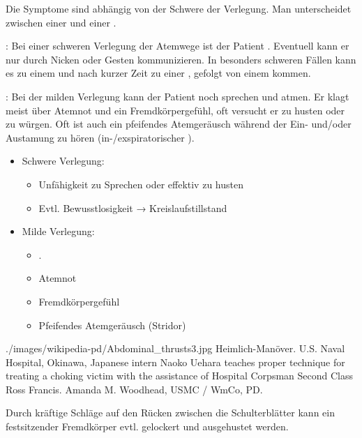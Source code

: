 \clearpage
{}
{%
Die Symptome sind abhängig  von der Schwere der Verlegung.
Man unterscheidet zwischen einer  und einer
\citep{Erc2005Sec2,Erc2005Sec6,Erc2005DeSec2,Erc2005DeSec6}.

:
Bei einer schweren Verlegung der Atemwege ist der Patient 
. Eventuell kann
er nur durch Nic\-k\-en oder Gesten kommunizieren. In besonders
schweren Fällen kann es zu einem  und nach
kurzer Zeit zu einer , gefolgt von einem
 kommen.


: Bei der milden Verlegung kann
der Patient noch sprechen und atmen. Er klagt meist über
Atemnot und ein Fremdkörpergefühl, oft versucht er zu husten
oder zu würgen. Oft ist auch ein pfeifendes Atemgeräusch
während der Ein- und/oder Austamung zu hören
(in-/exspiratorischer ).

\bigskip
}{
\begin{itemize}
  \item Schwere Verlegung:
  \begin{itemize}
    \item Unfähigkeit zu Sprechen oder effektiv zu husten
    \item Evtl. Bewusstlosigkeit → Kreislaufstillstand
  \end{itemize}
  \item Milde Verlegung:
  \begin{itemize}
    \item {}.
    \item Atemnot
    \item Fremdkörpergefühl
    \item Pfeifendes Atemgeräusch (Stridor)
  \end{itemize}
\end{itemize}
} 
{./images/wikipedia-pd/Abdominal_thrusts3.jpg} 
{Heimlich-Manöver.} 
{U.S. Naval Hospital, Okinawa, Japanese intern Naoko Uehara teaches
proper technique for treating a choking victim with the assistance of Hospital
Corpsman Second Class Ross Francis. Amanda M. Woodhead, USMC / WmCo, PD.}


{%
Durch kräftige Schläge auf den Rücken zwischen die Schulterblätter kann  ein
festsitzender Fremdkörper evtl. gelockert und ausgehustet werden.}
{}{}{}{}


